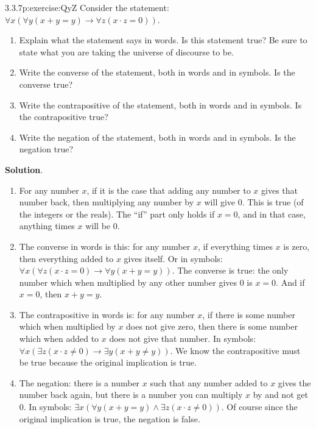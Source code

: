 \documentclass[twoside,11pt,]{book}
\newcommand{\blocktitlefont}{\relax}
\numberwithin{equation}{chapter}
\newcommand{\imp}{\rightarrow}
\begin{document}
\begin{divisionsolution}{3.3.7}{}{p:exercise:QyZ}%
Consider the statement: \(\forall x (\forall y (x + y = y) \imp \forall z (x\cdot z = 0))\).%
\begin{enumerate}[label=(\alph*)]
\item{}Explain what the statement says in words. Is this statement true? Be sure to state what you are taking the universe of discourse to be.%
\item{}Write the converse of the statement, both in words and in symbols. Is the converse true?%
\item{}Write the contrapositive of the statement, both in words and in symbols. Is the contrapositive true?%
\item{}Write the negation of the statement, both in words and in symbols. Is the negation true?%
\end{enumerate}
%
\par\smallskip%
\noindent\textbf{\blocktitlefont Solution}.\quad{}%
\begin{enumerate}[label=(\alph*)]
\item{}For any number \(x\), if it is the case that adding any number to \(x\) gives that number back, then multiplying any number by \(x\) will give 0. This is true (of the integers or the reals). The ``if'' part only holds if \(x = 0\), and in that case, anything times \(x\) will be 0.%
\item{}The converse in words is this: for any number \(x\), if everything times \(x\) is zero, then everything added to \(x\) gives itself. Or in symbols: \(\forall x (\forall z (x \cdot z = 0) \imp \forall y (x + y = y))\). The converse is true: the only number which when multiplied by any other number gives 0 is \(x = 0\). And if \(x = 0\), then \(x + y = y\).%
\item{}The contrapositive in words is: for any number \(x\), if there is some number which when multiplied by \(x\) does not give zero, then there is some number which when added to \(x\) does not give that number. In symbols: \(\forall x (\exists z (x\cdot z \ne 0) \imp \exists y (x + y \ne y))\). We know the contrapositive must be true because the original implication is true.%
\item{}The negation: there is a number \(x\) such that any number added to \(x\) gives the number back again, but there is a number you can multiply \(x\) by and not get 0. In symbols: \(\exists x (\forall y (x + y = y) \wedge \exists z (x \cdot z \ne 0))\). Of course since the original implication is true, the negation is false.%
\end{enumerate}
%
\end{divisionsolution}%
\end{document}
